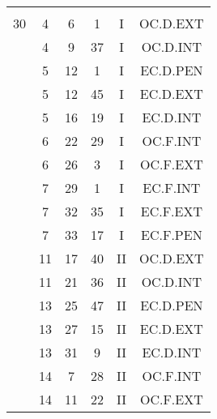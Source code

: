 \documentclass[12pt, a4paper]{article}
\begin{document}
\begin{multicols}{3}
{\begin{tabular}{c c c c c c}
	 	 	 	 & & & & & \\%
	 	 	 	30 & 4 & 6 & 1 & I & OC.D.EXT\\%
	 	 	 	 & 4 & 9 & 37 & I & OC.D.INT\\%
	 	 	 	 & 5 & 12 & 1 & I & EC.D.PEN\\%
	 	 	 	 & 5 & 12 & 45 & I & EC.D.EXT\\%
	 	 	 	 & 5 & 16 & 19 & I & EC.D.INT\\%
	 	 	 	 & 6 & 22 & 29 & I & OC.F.INT\\%
	 	 	 	 & 6 & 26 & 3 & I & OC.F.EXT\\%
	 	 	 	 & 7 & 29 & 1 & I & EC.F.INT\\%
	 	 	 	 & 7 & 32 & 35 & I & EC.F.EXT\\%
	 	 	 	 & 7 & 33 & 17 & I & EC.F.PEN\\%
	 	 	 	 & 11 & 17 & 40 & II & OC.D.EXT\\%
	 	 	 	 & 11 & 21 & 36 & II & OC.D.INT\\%
	 	 	 	 & 13 & 25 & 47 & II & EC.D.PEN\\%
	 	 	 	 & 13 & 27 & 15 & II & EC.D.EXT\\%
	 	 	 	 & 13 & 31 & 9 & II & EC.D.INT\\%
	 	 	 	 & 14 & 7 & 28 & II & OC.F.INT\\%
	 	 	 	 & 14 & 11 & 22 & II & OC.F.EXT\\%
	 	 \end{tabular}
 	}
\end{multicols}
\end{document}
